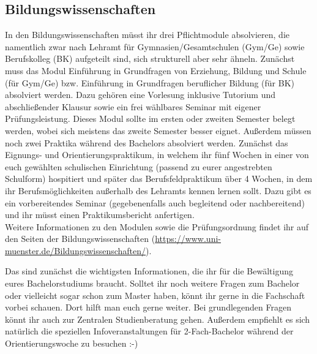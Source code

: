 \begin{multicols*}{2}
\subsection*{Bildungswissenschaften}
In den Bildungswissenschaften müsst ihr drei Pflichtmodule absolvieren, die namentlich zwar nach Lehramt für Gymnasien/Gesamtschulen (Gym/Ge) sowie Berufskolleg (BK) aufgeteilt sind, sich strukturell aber sehr ähneln. Zunächst muss das Modul Einführung in Grundfragen von Erziehung, Bildung und Schule (für Gym/Ge) bzw. Einführung in Grundfragen beruflicher Bildung (für BK) absolviert werden. Dazu gehören eine Vorlesung inklusive Tutorium und abschließender Klausur sowie ein frei wählbares Seminar mit eigener Prüfungsleistung. Dieses Modul sollte im ersten oder zweiten Semester belegt werden, wobei sich meistens das zweite Semester besser eignet. Außerdem müssen noch zwei Praktika während des Bachelors absolviert werden. Zunächst das Eignungs- und Orientierungspraktikum, in welchem ihr fünf Wochen in einer von euch gewählten schulischen Einrichtung (passend zu eurer angestrebten Schulform) hospitiert und später das Berufsfeldpraktikum über 4 Wochen, in dem ihr Berufsmöglichkeiten außerhalb des Lehramts kennen lernen sollt.  Dazu gibt es ein vorbereitendes Seminar (gegebenenfalls auch begleitend oder nachbereitend) und ihr müsst einen Praktikumsbericht anfertigen.\\ Weitere Informationen zu den Modulen sowie die Prüfungsordnung findet ihr auf den Seiten der Bildungswissenschaften (\url{https://www.uni-muenster.de/Bildungswissenschaften/}).

Das sind zunächst die wichtigsten Informationen, die ihr für die Bewältigung eures Bachelorstudiums braucht. Solltet ihr noch weitere Fragen zum Bachelor oder vielleicht sogar schon zum Master haben, könnt ihr gerne in die Fachschaft vorbei schauen. Dort hilft man euch gerne weiter. Bei grundlegenden Fragen könnt ihr auch zur Zentralen Studienberatung gehen. Außerdem empfiehlt es sich natürlich die speziellen Infoveranstaltungen für 2-Fach-Bachelor während der Orientierungswoche zu besuchen :-)


\end{multicols*}
